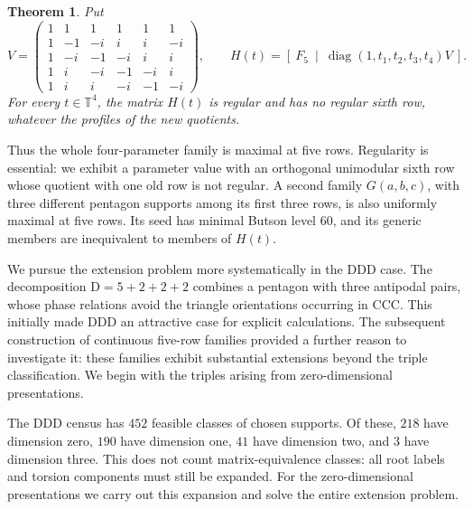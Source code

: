 \documentclass[11pt,a4paper]{article}
\theoremstyle{plain}
\theoremstyle{definition}
\theoremstyle{plain}
\newtheorem{introtheorem}{Theorem}
\begin{document}
\par\addvspace{\medskipamount}\noindent
\begin{minipage}{\linewidth}
\begin{introtheorem}\label{intro:five}
Put
\[
V=\begin{pmatrix}
1&1&1&1&1&1\\
1&-1&-i&i&i&-i\\
1&-i&-1&-i&i&i\\
1&i&-i&-1&-i&i\\
1&i&i&-i&-1&-i
\end{pmatrix},
\qquad
H(t)=\left[\ F_5\ \middle|\ \operatorname{diag}(1,t_1,t_2,t_3,t_4)V\ \right].
\]
For every $t\in\mathbb T^4$, the matrix $H(t)$ is regular and has no regular sixth row, whatever the profiles of the new quotients.
\end{introtheorem}
\end{minipage}
\par\addvspace{\medskipamount}

Thus the whole four-parameter family is maximal at five rows. Regularity is essential: we exhibit a parameter value with an orthogonal unimodular sixth row whose quotient with one old row is not regular. A second family $G(a,b,c)$, with three different pentagon supports among its first three rows, is also uniformly maximal at five rows. Its seed has minimal Butson level $60$, and its generic members are inequivalent to members of $H(t)$.

We pursue the extension problem more systematically in the $\mathrm{DDD}$ case. The decomposition $\mathrm D=5+2+2+2$ combines a pentagon with three antipodal pairs, whose phase relations avoid the triangle orientations occurring in $\mathrm{CCC}$. This initially made $\mathrm{DDD}$ an attractive case for explicit calculations. The subsequent construction of continuous five-row families provided a further reason to investigate it: these families exhibit substantial extensions beyond the triple classification. We begin with the triples arising from zero-dimensional presentations.

The $\mathrm{DDD}$ census has $452$ feasible classes of chosen supports. Of these, $218$ have dimension zero, $190$ have dimension one, $41$ have dimension two, and $3$ have dimension three. This does not count matrix-equivalence classes: all root labels and torsion components must still be expanded. For the zero-dimensional presentations we carry out this expansion and solve the entire extension problem.
\end{document}
